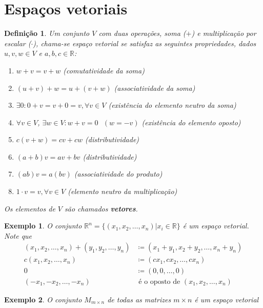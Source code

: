 \documentclass{article}
\newtheorem*{definition}{Definição}
\newtheorem*{example}{Exemplo}
\begin{document}
\section{Espaços vetoriais}
\begin{definition}
	Um conjunto $V$ com duas operações, soma ($+$) e multiplicação por escalar ($\cdot$), chama-se espaço vetorial se satisfaz as seguintes propriedades, dados $u, v, w\in V$ e $a, b, c\in\mathbb{R}$:
	\begin{enumerate}
		\item $w + v = v + w$ (comutatividade da soma)
		\item $(u+v) + w = u + (v + w)$ (associatividade da soma)
		\item $\exists 0: 0 + v = v + 0 = v, \forall v\in V$ (existência do elemento neutro da soma)
		\item $\forall v\in V$, $\exists w\in V:w + v = 0\text{ }(w = -v)$ (existência do elemento oposto)
		\item $c(v + w) = cv + cw$ (distributividade)
		\item $(a + b)v = av + bv$ (distributividade)
		\item $(ab)v = a(bv)$ (associatividade do produto)
		\item $1\cdot v = v, \forall v\in V$ (elemento neutro da multiplicação)
	\end{enumerate}
\par\vspace{0.3cm} Os elementos de $V$ são chamados \textbf{vetores}.
\end{definition}

\begin{example}
	O conjunto $\mathbb{R}^n = \{  (x_1, x_2, \dots, x_n)|x_i\in\mathbb{R}  \}$ é um espaço vetorial. Note que 
	\begin{align*}
	(x_1, x_2, \dots, x_n) + (y_1, y_2, \dots, y_n) &\coloneqq (x_1 + y_1, x_2 + y_2, \dots, x_n + y_n) \\
	c(x_1, x_2, \dots, x_n) &\coloneqq (cx_1, cx_2, \dots, cx_n) \\
	0 &\coloneqq (0, 0, \dots, 0) \\
	(-x_1, -x_2, \dots, -x_n)&\text{ é o oposto de }(x_1, x_2, \dots, x_n)
	\end{align*}
\end{example}

\begin{example}
	O conjunto $M_{m\times n}$ de todas as matrizes $m\times n$ é um espaço vetorial
\end{example}
\end{document}
